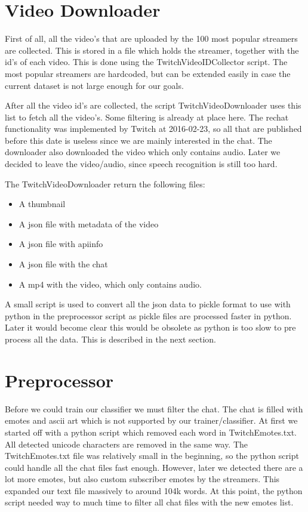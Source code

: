 \documentclass[final]{report}
\begin{document}
\section{Video Downloader}
First of all, all the video's that are uploaded by the 100 most popular streamers are collected. This is stored in a file which holds the streamer, together with the id's of each video.
This is done using the TwitchVideoIDCollector script. The most popular streamers are hardcoded, but can be extended easily in case the current dataset is not large enough for our goals.

After all the video id's are collected, the script TwitchVideoDownloader uses this list to fetch all the video's.
Some filtering is already at place here. The rechat functionality was implemented by Twitch at 2016-02-23, so all that are published before this date is useless since we are mainly interested in the chat.
The downloader also downloaded the video which only contains audio. Later we decided to leave the video/audio, since speech recognition is still too hard.

The TwitchVideoDownloader return the following files:
\begin{itemize}
\item A thumbnail
\item A json file with metadata of the video 
\item A json file with apiinfo
\item A json file with the chat
\item A mp4 with the video, which only contains audio.
\end{itemize}

A small script is used to convert all the json data to pickle format to use with python in the preprocessor script as pickle files are processed faster in python. Later it would become clear this would be obsolete as python is too slow to pre process all the data. This is described in the next section.

\section{Preprocessor}
Before we could train our classifier we must filter the chat.
The chat is filled with emotes and ascii art which is not supported by our trainer/classifier.
At first we started off with a python script which removed each word in TwitchEmotes.txt.
All detected unicode characters are removed in the same way.
The TwitchEmotes.txt file was relatively small in the beginning, so the python script could handle all the chat files fast enough.
However, later we detected there are a lot more emotes, but also custom subscriber emotes by the streamers.
This expanded our text file massively to around 104k words. 
At this point, the python script needed way to much time to filter all chat files with the new emotes list.
\end{document}

